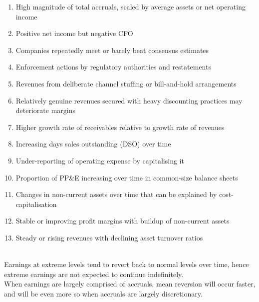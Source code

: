 \begin{remark} 
\begin{enumerate}[label=\roman*.]
\setlength{\itemsep}{0pt}
\item High magnitude of total accruals, scaled by average assets or net operating income
\item Positive net income but negative CFO
\item Companies repeatedly meet or barely beat consensus estimates
\item Enforcement actions by regulatory authorities and restatements
\item Revenues from deliberate channel stuffing or bill-and-hold arrangements
\item Relatively genuine revenues secured with heavy discounting practices may deteriorate margins
\item Higher growth rate of receivables relative to growth rate of revenues
\item Increasing days sales outstanding (DSO) over time
\item Under-reporting of operating expense by capitalising it
\item Proportion of PP&E increasing over time in common-size balance sheets
\item Changes in non-current assets over time that can be explained by cost-capitalisation
\item Stable or improving profit margins with buildup of non-current assets
\item Steady or rising revenues with declining asset turnover ratios
\end{enumerate}
\end{remark}

\begin{remark} \\
Earnings at extreme levels tend to revert back to normal levels over time, hence extreme earnings are not expected to continue indefinitely.\\
When earnings are largely comprised of accruals, mean reversion will occur faster, and will be even more so when accruals are largely discretionary.
\end{remark}

